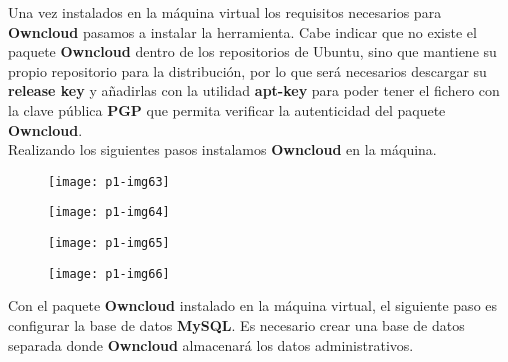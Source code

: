 \documentclass[10pt]{article}
\begin{document}
Una vez instalados en la máquina virtual los requisitos necesarios para \textbf{Owncloud} pasamos a instalar la herramienta. Cabe indicar que no existe el paquete \textbf{Owncloud} dentro de los repositorios de Ubuntu, sino que mantiene su propio repositorio para la distribución, por lo que será necesarios descargar su \textbf{release key} y añadirlas con la utilidad \textbf{apt-key} para poder tener el fichero con la clave pública \textbf{PGP} que permita verificar la autenticidad del paquete \textbf{Owncloud}. \\

Realizando los siguientes pasos instalamos \textbf{Owncloud} en la máquina.\\

\begin{figure}[H]
	\begin{center}
 		\texttt{[image: p1-img63]}
	\end{center} 
\end{figure}

\begin{figure}[H]
	\begin{center}
 		\texttt{[image: p1-img64]}
	\end{center} 
\end{figure}

\begin{figure}[H]
	\begin{center}
 		\texttt{[image: p1-img65]}
	\end{center} 
\end{figure}

\begin{figure}[H]
	\begin{center}
 		\texttt{[image: p1-img66]}
	\end{center} 
\end{figure}

Con el paquete \textbf{Owncloud} instalado en la máquina virtual, el siguiente paso es configurar la base de datos \textbf{MySQL}. Es necesario crear una base de datos separada donde \textbf{Owncloud} almacenará los datos administrativos.\\
\end{document}
